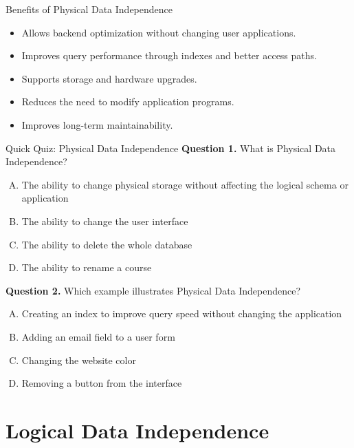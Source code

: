 \documentclass[aspectratio=169,11pt]{beamer}
\begin{document}
\begin{frame}{Benefits of Physical Data Independence}
\begin{itemize}
  \item Allows backend optimization without changing user applications.
  \item Improves query performance through indexes and better access paths.
  \item Supports storage and hardware upgrades.
  \item Reduces the need to modify application programs.
  \item Improves long-term maintainability.
\end{itemize}
\end{frame}

\begin{frame}{Quick Quiz: Physical Data Independence}
\textbf{Question 1.} What is Physical Data Independence?
\begin{enumerate}[A.]
  \item The ability to change physical storage without affecting the logical schema or application
  \item The ability to change the user interface
  \item The ability to delete the whole database
  \item The ability to rename a course
\end{enumerate}

\vspace{0.2cm}
\textbf{Question 2.} Which example illustrates Physical Data Independence?
\begin{enumerate}[A.]
  \item Creating an index to improve query speed without changing the application
  \item Adding an email field to a user form
  \item Changing the website color
  \item Removing a button from the interface
\end{enumerate}
\end{frame}

\section{Logical Data Independence}
\end{document}
